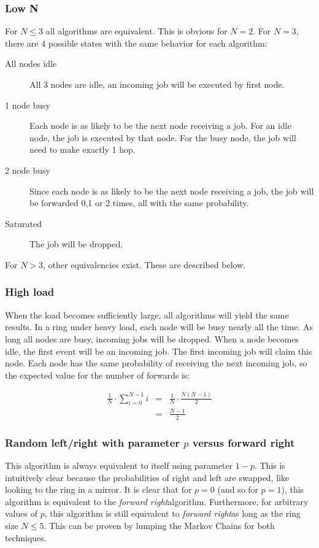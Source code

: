 \documentclass[10pt,a4paper]{article}
\newcommand{\FR}{\textit{forward right\xspace}}
\begin{document}
\subsubsection*{Low N}
For $N \leq 3$ all algorithms are equivalent. This is obvious for $N=2$. For $N=3$, there are 4 possible states with the same behavior for each algorithm:
\begin{description}
\item[All nodes idle] All 3 nodes are idle, an incoming job will be executed by first node.
\item[1 node busy] Each node is as likely to be the next node receiving a job. For an idle node, the job is executed by that node. For the busy node, the job will need to make exactly 1 hop.
\item[2 node busy] Since each node is as likely to be the next node receiving a job, the job will be forwarded 0,1 or 2 times, all with the same probability.
\item[Saturated] The job will be dropped.
\end{description}

For $N>3$, other equivalencies exist. These are described below.

\subsubsection*{High load}
When the load becomes sufficiently large, all algorithms will yield the same results. In a ring under heavy load, each node will be busy nearly all the time. As long all nodes are busy, incoming jobs will be dropped.
When a node becomes idle, the first event will be an incoming job. The first incoming job will claim this node. Each node has the same probability of receiving the next incoming job, so the expected value for the number of forwards is:

\begin{eqnarray}
\frac{1}{N} \cdot \sum_{i=0}^{N-1} i &=& \frac{1}{N} \cdot \frac{N(N-1)}{2} \nonumber \\
&=& \frac{N-1}{2} \nonumber
\end{eqnarray}

\subsubsection*{Random left/right with parameter $p$ versus forward right}
This algorithm is always equivalent to itself using parameter $1-p$. This is intuitively clear because the probabilities of right and left are swapped, like looking to the ring in a mirror.
It is clear that for $p=0$ (and so for $p=1$), this algorithm is equivalent to the \FR algorithm. Furthermore, for arbitrary values of $p$, this algorithm is still equivalent to \FR as long as the ring size $N \leq 5$. This can be proven by lumping the Markov Chains for both techniques.
\end{document}
